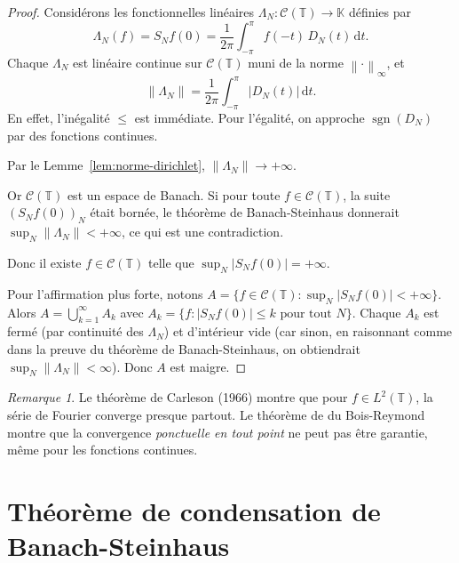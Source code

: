 \documentclass[a4paper,12pt]{book}
\DeclareMathOperator{\sgn}{sgn}
\newcommand{\K}{\mathbb{K}}
\newcommand{\dd}{\mathrm{d}}
\newcommand{\norm}[1]{\left\| #1 \right\|}
\newcommand{\abs}[1]{\left| #1 \right|}
\theoremstyle{definition}
\theoremstyle{plain}
\theoremstyle{remark}
\newtheorem{remarque}[definition]{Remarque}
\begin{document}
\begin{proof}
Considérons les fonctionnelles linéaires $\Lambda_N : \mathcal{C}(\mathbb{T}) \to \K$
définies par
\[
  \Lambda_N(f) = S_N f(0) = \frac{1}{2\pi} \int_{-\pi}^{\pi} f(-t)\, D_N(t)\, \dd t.
\]
Chaque $\Lambda_N$ est linéaire continue sur $\mathcal{C}(\mathbb{T})$ muni de la norme
$\norm{\cdot}_\infty$, et
\[
  \norm{\Lambda_N} = \frac{1}{2\pi} \int_{-\pi}^{\pi} \abs{D_N(t)}\, \dd t.
\]
En effet, l'inégalité $\leq$ est immédiate. Pour l'égalité, on approche $\sgn(D_N)$
par des fonctions continues.

Par le Lemme~\ref{lem:norme-dirichlet}, $\norm{\Lambda_N} \to +\infty$.

Or $\mathcal{C}(\mathbb{T})$ est un espace de Banach.
Si pour toute $f \in \mathcal{C}(\mathbb{T})$, la suite $(S_N f(0))_N$ était bornée,
le théorème de Banach-Steinhaus donnerait $\sup_N \norm{\Lambda_N} < +\infty$,
ce qui est une contradiction.

Donc il existe $f \in \mathcal{C}(\mathbb{T})$ telle que $\sup_N \abs{S_N f(0)} = +\infty$.

Pour l'affirmation plus forte, notons $A = \{f \in \mathcal{C}(\mathbb{T}) :
\sup_N \abs{S_N f(0)} < +\infty\}$. Alors $A = \bigcup_{k=1}^{\infty} A_k$ avec
$A_k = \{f : \abs{S_N f(0)} \leq k \text{ pour tout } N\}$. Chaque $A_k$ est fermé
(par continuité des $\Lambda_N$) et d'intérieur vide (car sinon, en raisonnant comme
dans la preuve du théorème de Banach-Steinhaus, on obtiendrait $\sup_N \norm{\Lambda_N} < \infty$).
Donc $A$ est maigre.
\end{proof}

\begin{remarque}
\label{rem:carleson}
Le théorème de Carleson (1966) montre que pour $f \in L^2(\mathbb{T})$,
la série de Fourier converge presque partout. Le théorème de du Bois-Reymond
montre que la convergence \emph{ponctuelle en tout point} ne peut pas être
garantie, même pour les fonctions continues.
\end{remarque}


\section{Théorème de condensation de Banach-Steinhaus}
\label{sec:condensation}
\end{document}
